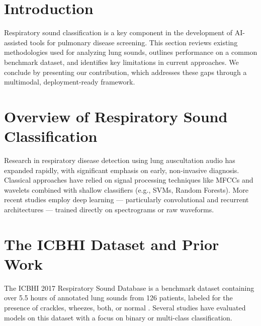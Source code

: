\section*{Introduction}
Respiratory sound classification is a key component in the development of AI-assisted tools for pulmonary disease screening. This section reviews existing methodologies used for analyzing lung sounds, outlines performance on a common benchmark dataset, and identifies key limitations in current approaches. We conclude by presenting our contribution, which addresses these gaps through a multimodal, deployment-ready framework.

\newpage

\section{Overview of Respiratory Sound Classification}
Research in respiratory disease detection using lung auscultation audio has expanded rapidly, with significant emphasis on early, non-invasive diagnosis. Classical approaches have relied on signal processing techniques like MFCCs and wavelets combined with shallow classifiers (e.g., SVMs, Random Forests). More recent studies employ deep learning — particularly convolutional and recurrent architectures — trained directly on spectrograms or raw waveforms.

\section{The ICBHI Dataset and Prior Work}
The ICBHI 2017 Respiratory Sound Database is a benchmark dataset containing over 5.5 hours of annotated lung sounds from 126 patients, labeled for the presence of crackles, wheezes, both, or normal \cite{rocha2017open}. Several studies have evaluated models on this dataset with a focus on binary or multi-class classification.

